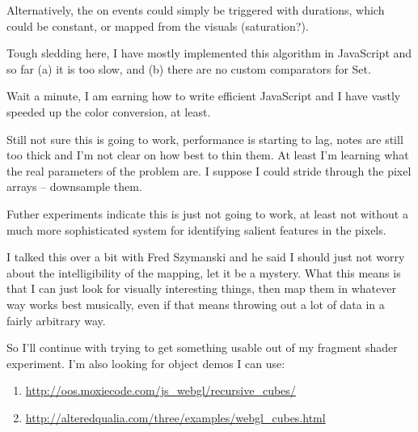 \documentclass[english,11pt,letterpaper,onecolumn]{scrartcl}
\begin{document}
Alternatively, the on events could simply be triggered with durations, which 
could be constant, or mapped from the visuals (saturation?).

Tough sledding here, I have mostly implemented this algorithm in JavaScript 
and so far (a) it is too slow, and (b) there are no custom comparators for Set.

Wait a minute, I am earning how to write efficient JavaScript and I have 
vastly speeded up the color conversion, at least.

Still not sure this is going to work, performance is starting to lag, notes 
are still too thick and I'm not clear on how best to thin them. At least I'm 
learning what the real parameters of the problem are. I suppose I could stride 
through the pixel arrays -- downsample them.

Futher experiments indicate this is just not going to work, at least not without a much more sophisticated system for identifying salient features in the pixels.

I talked this over a bit with Fred Szymanski and he said I should just not worry about the intelligibility of the mapping, let it be a mystery. What this means is that I can just look for visually interesting things, then map them in whatever way works best musically, even if that means throwing out a lot of data in a fairly arbitrary way.

So I'll continue with trying to get something usable out of my fragment shader experiment. I'm also looking for object demos I can use:

\begin{enumerate}
\item \url{http://oos.moxiecode.com/js_webgl/recursive_cubes/}
\item \url{http://alteredqualia.com/three/examples/webgl_cubes.html}

\end{enumerate}
\end{document}
